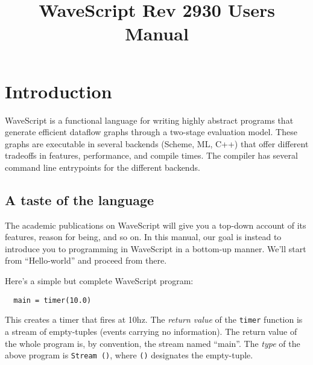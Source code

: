 \documentclass[twocolumn]{report}
\title{WaveScript Rev 2930 Users Manual}
\newcommand{\rednote}[1]{{\textcolor{blue}{#1}}}
\newcommand{\cde}{\tt}
\newcommand{\ws}{WaveScript}
\begin{document}
\maketitle


\tableofcontents
\clearpage

\chapter{Introduction}


WaveScript is a functional language for writing highly abstract
programs that generate efficient dataflow graphs through a two-stage
evaluation model.  These graphs are
executable in several backends (Scheme, ML, C++) that offer different
tradeoffs in features, performance, and compile times.  The compiler
has several command line entrypoints for the different backends.


\section{A taste of the language}\label{s:taste}

The academic publications on WaveScript will give you a top-down
account of its features, reason for being, and so on.  In this manual,
our goal is instead to introduce you to programming in WaveScript in a
bottom-up manner.  We'll start from ``Hello-world'' and proceed from
there.

Here's a simple but complete {\ws} program:
\begin{verbatim}
  main = timer(10.0)
\end{verbatim}
This creates a timer that fires at 10hz.  The {\em return value} of
the {\cde timer} function is a stream of empty-tuples (events carrying
no information).  The return value of the whole program is, by
convention, the stream named ``main''.  The {\em type} of the above
program is {\cde Stream ()}, where {\cde ()} designates the empty-tuple.
\end{document}
